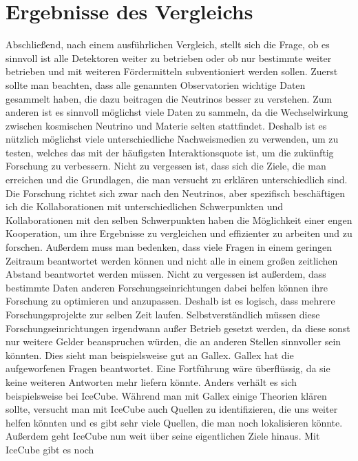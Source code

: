     \section{Ergebnisse des Vergleichs}

    Abschließend, nach einem ausführlichen Vergleich, stellt sich die Frage, ob es sinnvoll ist alle 
    Detektoren weiter zu betrieben oder ob nur bestimmte weiter betrieben und mit weiteren Fördermitteln 
    subventioniert werden sollen. Zuerst sollte man beachten, dass alle genannten Observatorien wichtige 
    Daten gesammelt haben, die dazu beitragen die Neutrinos besser zu verstehen. Zum anderen ist es sinnvoll 
    möglichst viele Daten zu sammeln, da die Wechselwirkung zwischen kosmischen Neutrino und Materie selten 
    stattfindet. Deshalb ist es nützlich möglichst viele unterschiedliche Nachweismedien zu verwenden, um zu 
    testen, welches das mit der häufigsten Interaktionsquote ist, um die zukünftig Forschung zu verbessern. 
    Nicht  zu  vergessen  ist,  dass  sich  die  Ziele,  die  man  erreichen  und  die Grundlagen, die man 
    versucht zu erklären unterschiedlich sind. Die Forschung richtet sich zwar nach den Neutrinos, aber 
    spezifisch beschäftigen ich die Kollaborationen mit unterschiedlichen Schwerpunkten und Kollaborationen 
    mit den selben Schwerpunkten haben die Möglichkeit einer engen Kooperation, um ihre Ergebnisse zu 
    vergleichen und effizienter zu arbeiten und zu forschen. Außerdem muss man bedenken, dass viele Fragen 
    in einem geringen Zeitraum beantwortet werden können und nicht alle in einem großen zeitlichen Abstand 
    beantwortet werden müssen. Nicht zu vergessen ist außerdem, dass bestimmte Daten anderen 
    Forschungseinrichtungen dabei helfen können ihre Forschung zu optimieren und anzupassen. Deshalb ist es 
    logisch, dass mehrere Forschungsprojekte zur selben Zeit laufen. Selbstverständlich müssen diese 
    Forschungseinrichtungen irgendwann außer Betrieb gesetzt werden, da diese sonst nur weitere Gelder 
    beanspruchen würden, die an anderen Stellen sinnvoller sein könnten. Dies sieht man beispielsweise 
    gut an Gallex. Gallex hat die aufgeworfenen Fragen beantwortet. Eine Fortführung wäre überflüssig, 
    da sie keine weiteren Antworten mehr liefern könnte. Anders verhält es sich beispielsweise bei IceCube. 
    Während man mit Gallex einige Theorien klären sollte, versucht man mit IceCube auch Quellen zu 
    identifizieren, die uns weiter helfen könnten und es gibt sehr viele Quellen, die man noch lokalisieren 
    könnte. Außerdem geht IceCube nun weit über seine eigentlichen Ziele hinaus. Mit IceCube gibt es noch 
